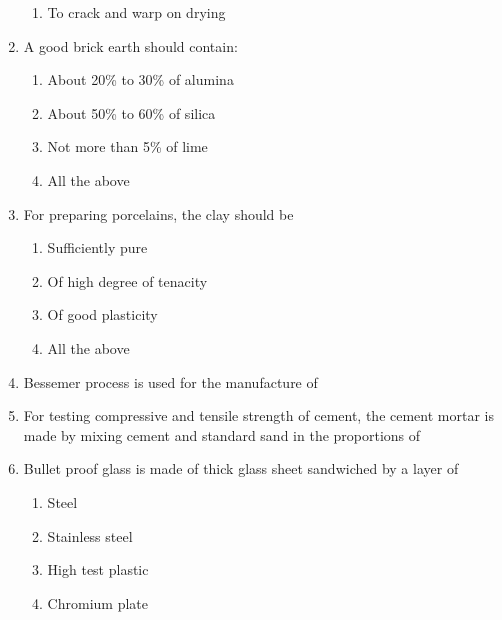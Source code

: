 \documentclass[11pt,a4paper]{article}
\begin{document}
\begin{enumerate}
\begin{enumerate}[label=\Alph*.]
\item{To crack and warp on drying}
\end{enumerate}
\item{A good brick earth should contain:}
\begin{enumerate}[label=\Alph*.]
\item{About 20\% to 30\% of alumina}
\item{About 50\% to 60\% of silica}
\item{Not more than 5\% of lime}
\item{All the above}
\end{enumerate}
\item{For preparing porcelains, the clay should be}
\begin{enumerate}[label=\Alph*.]
\item{Sufficiently pure}
\item{Of high degree of tenacity}
\item{Of good plasticity}
\item{All the above}
\end{enumerate}
\item{Bessemer process is used for the manufacture of}
\\
\item{For testing compressive and tensile strength of cement, the cement mortar is made by mixing cement and standard sand in the proportions of}
\\
\item{Bullet proof glass is made of thick glass sheet sandwiched by a layer of}
\begin{enumerate}[label=\Alph*.]
\item{Steel}
\item{Stainless steel}
\item{High test plastic}
\item{Chromium plate}

\end{enumerate}
\end{enumerate}
\end{document}
